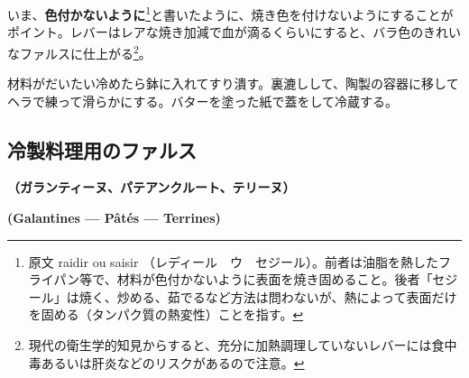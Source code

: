 \begin{recette}
いま、\textbf{色付かないように}\footnote{原文 raidir ou saisir
  （レディール　ウ　セジール）。前者は油脂を熱したフライパン等で、材料が色付かないように表面を焼き固めること。後者「セジール」は焼く、炒める、茹でるなど方法は問わないが、熱によって表面だけを固める（タンパク質の熱変性）ことを指す。}と書いたように、焼き色を付けないようにすることがポイント。レバーはレアな焼き加減で血が滴るくらいにすると、バラ色のきれいなファルスに仕上がる\footnote{現代の衛生学的知見からすると、充分に加熱調理していないレバーには食中毒あるいは肝炎などのリスクがあるので注意。}。

材料がだいたい冷めたら鉢に入れてすり潰す。裏漉しして、陶製の容器に移してヘラで練って滑らかにする。バターを塗った紙で蓋をして冷蔵する。

\end{recette}

\begin{main}

\hypertarget{farce-pour-les-pieces-froides}{%
\subsection{冷製料理用のファルス}\label{farce-pour-les-pieces-froides}}

\vspace{-1.5\zw}
\begin{center}
\textbf{（ガランティーヌ、パテアンクルート、テリーヌ）}
\end{center}
\vspace{.5\zw}
\begin{center}
\vspace{-1\zw}
\hspace{1\zw}\textbf{(Galantines --- Pâtés --- Terrines)}
\end{center}


\normalfont

\end{main}

